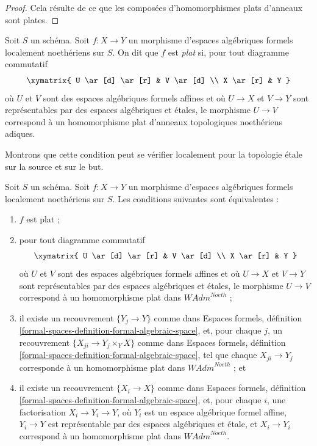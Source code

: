 \begin{proof}
Cela résulte de ce que les composées d'homomorphismes plats d'anneaux
sont plates.
\end{proof}

\begin{definition}
\label{definition-flat}
Soit $S$ un schéma. Soit $f : X \to Y$ un morphisme d'espaces algébriques
formels localement noethériens sur $S$. On dit que $f$ est {\it plat} si,
pour tout diagramme commutatif
$$
\xymatrix{
U \ar[d] \ar[r] & V \ar[d] \\
X \ar[r] & Y
}
$$
où $U$ et $V$ sont des espaces algébriques formels affines et où $U \to X$
et $V \to Y$ sont représentables par des espaces algébriques et étales,
le morphisme $U \to V$ correspond à un homomorphisme plat d'anneaux
topologiques noethériens adiques.
\end{definition}

\noindent
Montrons que cette condition peut se vérifier localement pour la topologie
étale sur la source et sur le but.

\begin{lemma}
\label{lemma-flat-morphisms}
Soit $S$ un schéma. Soit $f : X \to Y$ un morphisme d'espaces algébriques
formels localement noethériens sur $S$. Les conditions suivantes sont
équivalentes :
\begin{enumerate}
\item $f$ est plat ;
\item pour tout diagramme commutatif
$$
\xymatrix{
U \ar[d] \ar[r] & V \ar[d] \\
X \ar[r] & Y
}
$$
où $U$ et $V$ sont des espaces algébriques formels affines et où $U \to X$
et $V \to Y$ sont représentables par des espaces algébriques et étales,
le morphisme $U \to V$ correspond à un homomorphisme plat dans
$\textit{WAdm}^{Noeth}$ ;
\item il existe un recouvrement $\{Y_j \to Y\}$ comme dans Espaces
formels, définition \ref{formal-spaces-definition-formal-algebraic-space},
et, pour chaque $j$, un recouvrement $\{X_{ji} \to Y_j \times_Y X\}$
comme dans Espaces formels, définition
\ref{formal-spaces-definition-formal-algebraic-space}, tel que chaque
$X_{ji} \to Y_j$ corresponde à un homomorphisme plat dans
$\textit{WAdm}^{Noeth}$ ; et
\item il existe un recouvrement $\{X_i \to X\}$ comme dans Espaces
formels, définition \ref{formal-spaces-definition-formal-algebraic-space},
et, pour chaque $i$, une factorisation $X_i \to Y_i \to Y$, où $Y_i$ est
un espace algébrique formel affine, $Y_i \to Y$ est représentable par des
espaces algébriques et étale, et $X_i \to Y_i$ correspond à un
homomorphisme plat dans $\textit{WAdm}^{Noeth}$.
\end{enumerate}
\end{lemma}

